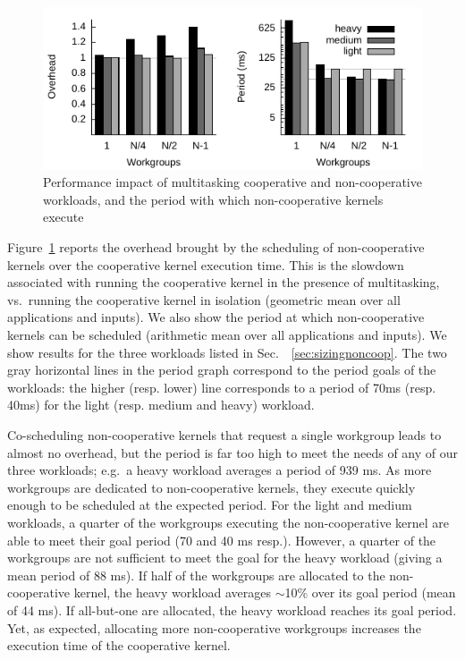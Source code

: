\documentclass[parskip=half,sigconf,review, anonymous=true, acmcopyrightmode=none]{acmart}
\newcommand{\myfiglong}{Figure~}
\newcommand{\mysec}{Sec.~}
\begin{document}
\begin{figure}
\includegraphics[width=\columnwidth]{heavy.pdf}
\caption{Performance impact of multitasking cooperative and non-cooperative workloads, and the period with which non-cooperative kernels execute}\label{fig:performance}
\vspace{-5mm}
\end{figure}


 \myfiglong\ref{fig:performance} reports the
overhead brought by the scheduling of non-cooperative kernels over the
cooperative kernel execution time.  This is the slowdown associated
with running the cooperative kernel in the presence of multitasking,
vs.\ running the cooperative kernel in isolation (geometric mean over
all applications and inputs).  We also show the period at which
non-cooperative kernels can be scheduled (arithmetic mean over all
applications and inputs).
We show results for the three workloads listed in
\mysec~\ref{sec:sizingnoncoop}. The two gray horizontal lines in the
period graph correspond to the period goals of the workloads: the
higher (resp. lower) line corresponds to a period of 70ms (resp. 40ms)
for the light (resp. medium and heavy) workload.

Co-scheduling non-cooperative kernels that request a single workgroup leads to almost no overhead, but the period is far too high to meet the needs
of any of our three workloads; e.g.\ a heavy workload averages a
period of 939 ms. As more workgroups are dedicated to non-cooperative
kernels, they execute quickly enough to be scheduled at the expected
period. For the light and medium workloads, a quarter
of the workgroups executing the non-cooperative kernel are able to meet
their goal period (70 and 40 ms resp.). However, a quarter of the
workgroups are not sufficient to meet the goal for the heavy workload
(giving a mean period of 88 ms). If half of the workgroups are
allocated to the non-cooperative kernel, the heavy workload averages $\sim$10\% over its goal period (mean of 44 ms). If all-but-one are allocated, the heavy workload reaches its goal period.
%
Yet, as expected, allocating more non-cooperative workgroups increases
the execution time of the cooperative kernel.
\end{document}
